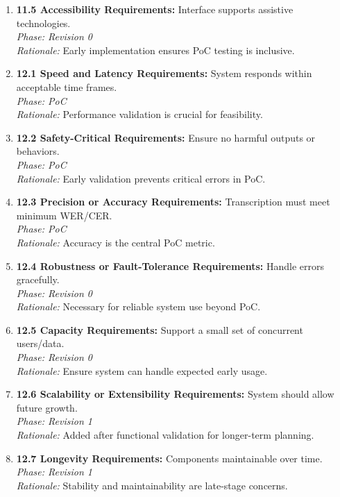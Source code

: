 \documentclass[12pt]{article}
\begin{document}
\begin{enumerate}
    \item \textbf{11.5 Accessibility Requirements:} Interface supports assistive technologies.\\
    \textit{Phase: Revision 0} \\
    \textit{Rationale:} Early implementation ensures PoC testing is inclusive.

    \item \textbf{12.1 Speed and Latency Requirements:} System responds within acceptable time frames.\\
    \textit{Phase: PoC} \\
    \textit{Rationale:} Performance validation is crucial for feasibility.

    \item \textbf{12.2 Safety-Critical Requirements:} Ensure no harmful outputs or behaviors.\\
    \textit{Phase: PoC} \\
    \textit{Rationale:} Early validation prevents critical errors in PoC.

    \item \textbf{12.3 Precision or Accuracy Requirements:} Transcription must meet minimum WER/CER.\\
    \textit{Phase: PoC} \\
    \textit{Rationale:} Accuracy is the central PoC metric.

    \item \textbf{12.4 Robustness or Fault-Tolerance Requirements:} Handle errors gracefully.\\
    \textit{Phase: Revision 0} \\
    \textit{Rationale:} Necessary for reliable system use beyond PoC.

    \item \textbf{12.5 Capacity Requirements:} Support a small set of concurrent users/data.\\
    \textit{Phase: Revision 0} \\
    \textit{Rationale:} Ensure system can handle expected early usage.

    \item \textbf{12.6 Scalability or Extensibility Requirements:} System should allow future growth.\\
    \textit{Phase: Revision 1} \\
    \textit{Rationale:} Added after functional validation for longer-term planning.

    \item \textbf{12.7 Longevity Requirements:} Components maintainable over time.\\
    \textit{Phase: Revision 1} \\
    \textit{Rationale:} Stability and maintainability are late-stage concerns.


\end{enumerate}
\end{document}
